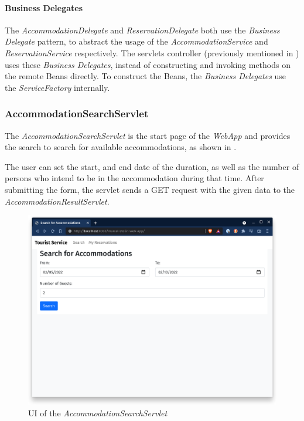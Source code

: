 \paragraph{Business Delegates}
The \textit{AccommodationDelegate} and \textit{ReservationDelegate} both use the \textit{Business Delegate} pattern, to abstract the usage of the \textit{AccommodationService} and \textit{ReservationService} respectively. The servlets controller (previously mentioned in ) uses these \textit{Business Delegates}, instead of constructing and invoking methods on the remote Beans directly. To construct the Beans, the \textit{Business Delegates} use the \textit{ServiceFactory} internally.

\newpage
\subsubsection{AccommodationSearchServlet}\label{sec:02_design_web_search}
The \textit{AccommodationSearchServlet} is the start page of the \textit{WebApp} and provides the search to search for available accommodations, as shown in .

The user can set the start, and end date of the duration, as well as the number of persons who intend to be in the accommodation during that time.
After submitting the form, the servlet sends a GET request with the given data to the \textit{AccommodationResultServlet}.
\begin{figure}[h]
\centering
\includegraphics[scale=0.14]{images/02_design/web-app-search}
\caption{UI of the \textit{AccommodationSearchServlet}}
\label{fig:02_design_web_search_page}
\end{figure}

